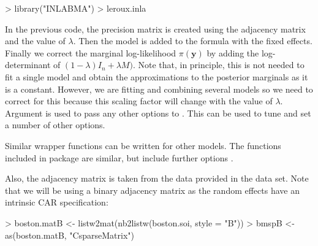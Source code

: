 \documentclass[article]{jss}
\begin{document}
\begin{Schunk}
\begin{Sinput}
> library("INLABMA")
> leroux.inla
\end{Sinput}
\end{Schunk}


In the previous code, the precision matrix is created using the adjacency
matrix and the value of $\lambda$. Then the  model is added to the
formula with the fixed effects. Finally we correct the marginal log-likelihood
$\pi(\mathbf{y})$ by adding the log-determinant of $(1-\lambda)I_n+\lambda M)$.
Note that, in principle, this is not needed to fit a single model and obtain
the approximations to the posterior marginals as it is a constant. However, we
are fitting and combining several models so we need to correct for this
because this scaling factor will change with the value of $\lambda$.
Argument  is used to pass any other options to . 
This can be used to tune and set a number of other options.

Similar wrapper functions can be written for other models. The functions
included in package  are similar, but include further options
\citep[see,][for details]{Bivandetal:2013}.



Also, the adjacency matrix is taken from the data provided in the 
data set.
Note that we will be using a binary adjacency matrix as the random
effects have an intrinsic CAR specification:
\begin{Schunk}
\begin{Sinput}
> boston.matB <- listw2mat(nb2listw(boston.soi, style = "B"))
> bmspB <- as(boston.matB, "CsparseMatrix")
\end{Sinput}
\end{Schunk}
\end{document}
